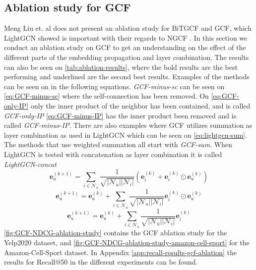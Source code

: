 \subsection{Ablation study for GCF}\label{subsec:gcf-ablation-study}
Meng Liu et. al does not present an ablation study for BiTGCF and GCF, which LightGCN showed is important with their regards to NGCF \cite{lightgcn,BiTGCF}.
In this section we conduct an ablation study on GCF to get an understanding on the effect of the different parts of the embedding propagation and layer combination.
The results can also be seen on \autoref{tab:ablation-results}, where the bold results are the best performing and underlined are the second best results.
Examples of the methods can be seen on in the following equations.
\textit{GCF-minus-sc} can be seen on \autoref{eq:GCF-minus-sc} where the self-connection has been removed.
On \autoref{eq:GCF-only-IP} only the inner product of the neighbor has been contained, and is called \textit{GCF-only-IP}
\autoref{eq:GCF-minus-IP} has the inner product been removed and is called \textit{GCF-minus-IP}.
There are also examples where GCF utilizes summation as layer combination as used in LightGCN which can be seen on \autoref{eq:lightgcn-sum}.
The methods that use weighted summation all start with \textit{GCF-sum}.
When LightGCN is tested with concatenation as layer combination it is called \textit{LightGCN-concat}
\begin{equation}
    \mathbf{e}_{u}^{(k+1)} = \sum^{}_{i \in \mathcal{N}_u}  \frac{1}{\sqrt{|\mathcal{N}_u||\mathcal{N}_i|}}\left( \mathbf{e}_i^{(k)} + \mathbf{e}_i^{(k)} \odot \mathbf{e}_u^{(k)} \right)
    \label{eq:GCF-minus-sc}
\end{equation}
\begin{equation}
    \mathbf{e}_{u}^{(k+1)} = \mathbf{e}_{u}^{(k)} + \sum^{}_{i \in \mathcal{N}_u}  \frac{1}{\sqrt{|\mathcal{N}_u||\mathcal{N}_i|}} \mathbf{e}_i^{(k)} \odot \mathbf{e}_u^{(k)}
    \label{eq:GCF-only-IP}
\end{equation}
\begin{equation}
    \mathbf{e}_{u}^{(k+1)} = \mathbf{e}_{u}^{(k)} + \sum^{}_{i \in \mathcal{N}_u}  \frac{1}{\sqrt{|\mathcal{N}_u||\mathcal{N}_i|}} \mathbf{e}_i^{(k)}
    \label{eq:GCF-minus-IP}
\end{equation}
\autoref{fig:GCF-NDCG-ablation-study} contains the GCF ablation study for the Yelp2020 dataset, and \autoref{fig:GCF-NDCG-ablation-study-amazon-cell-sport} for the Amazon-Cell-Sport dataset.
In Appendix \ref{app:recall-results-gcf-ablation} the results for Recall@50 in the different experiments can be found.
